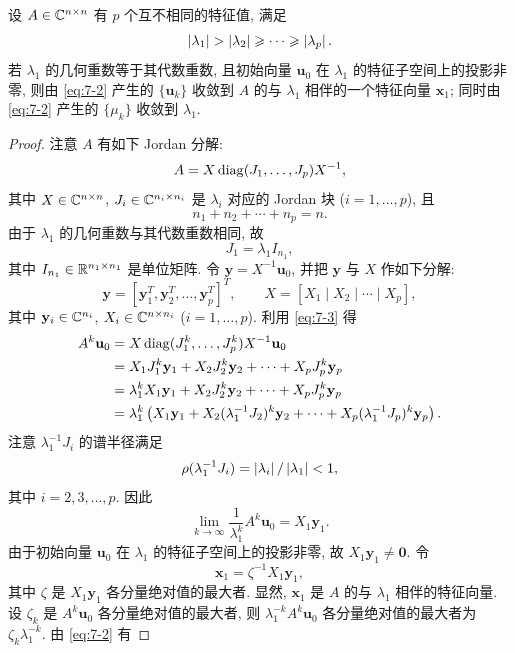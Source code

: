 \begin{theorem}
\label{thm:7-3}
设 $A\in\mathbb{C}^{n\times n}$ 有 $p$ 个互不相同的特征值, 满足
\[
  \abs{\lambda_1}>\abs{\lambda_2}\geqslant\cdots\geqslant\abs{\lambda_p}.
\]
若 $\lambda_1$ 的几何重数等于其代数重数, 且初始向量 $\mathbf{u}_0$ 在 $\lambda_1$ 的特征子空间上的投影非零, 则由 \eqref{eq:7-2} 产生的 $\{\mathbf{u}_k\}$ 收敛到 $A$ 的与 $\lambda_1$ 相伴的一个特征向量 $\mathbf{x}_1$; 同时由 \eqref{eq:7-2} 产生的 $\{\mu_k\}$ 收敛到 $\lambda_1$.
\end{theorem}

\begin{proof}
注意 $A$ 有如下 Jordan 分解:
\begin{equation}
  A=X\operatorname{diag}(J_1,\ldots,J_p)X^{-1},
  \label{eq:7-3}
\end{equation}
其中 $X\in\mathbb{C}^{n\times n}$, $J_i\in\mathbb{C}^{n_i\times n_i}$ 是 $\lambda_i$ 对应的 Jordan 块 ($i=1,\ldots,p$), 且
\[
  n_1+n_2+\cdots+n_p=n.
\]
由于 $\lambda_1$ 的几何重数与其代数重数相同, 故
\[
  J_1=\lambda_1I_{n_1},
\]
其中 $I_{n_1}\in\mathbb{R}^{n_1\times n_1}$ 是单位矩阵. 令 $\mathbf{y}=X^{-1}\mathbf{u}_0$, 并把 $\mathbf{y}$ 与 $X$ 作如下分解:
\[
  \mathbf{y}=[\mathbf{y}_1^T,\mathbf{y}_2^T,\ldots,\mathbf{y}_p^T]^T,
  \qquad
  X=[X_1\mid X_2\mid\cdots\mid X_p],
\]
其中 $\mathbf{y}_i\in\mathbb{C}^{n_i}$, $X_i\in\mathbb{C}^{n\times n_i}$ ($i=1,\ldots,p$). 利用 \eqref{eq:7-3} 得
\[
  \begin{aligned}
    A^k\mathbf{u}_0
    &=X\operatorname{diag}(J_1^k,\ldots,J_p^k)X^{-1}\mathbf{u}_0\\
    &=X_1J_1^k\mathbf{y}_1+X_2J_2^k\mathbf{y}_2+\cdots+X_pJ_p^k\mathbf{y}_p\\
    &=\lambda_1^kX_1\mathbf{y}_1+X_2J_2^k\mathbf{y}_2+\cdots+X_pJ_p^k\mathbf{y}_p\\
    &=\lambda_1^k\left(X_1\mathbf{y}_1
      +X_2(\lambda_1^{-1}J_2)^k\mathbf{y}_2
      +\cdots+X_p(\lambda_1^{-1}J_p)^k\mathbf{y}_p\right).
  \end{aligned}
\]
注意 $\lambda_1^{-1}J_i$ 的谱半径满足
\[
  \rho(\lambda_1^{-1}J_i)=\left|\lambda_i\right|/\left|\lambda_1\right|<1,
\]
其中 $i=2,3,\ldots,p$. 因此
\begin{equation}
  \lim_{k\rightarrow\infty}\frac{1}{\lambda_1^k}A^k\mathbf{u}_0=X_1\mathbf{y}_1.
  \label{eq:7-4}
\end{equation}
由于初始向量 $\mathbf{u}_0$ 在 $\lambda_1$ 的特征子空间上的投影非零, 故 $X_1\mathbf{y}_1\neq\mathbf{0}$. 令
\[
  \mathbf{x}_1=\zeta^{-1}X_1\mathbf{y}_1,
\]
其中 $\zeta$ 是 $X_1\mathbf{y}_1$ 各分量绝对值的最大者. 显然, $\mathbf{x}_1$ 是 $A$ 的与 $\lambda_1$ 相伴的特征向量. 设 $\zeta_k$ 是 $A^k\mathbf{u}_0$ 各分量绝对值的最大者, 则 $\lambda_1^{-k}A^k\mathbf{u}_0$ 各分量绝对值的最大者为 $\zeta_k\lambda_1^{-k}$. 由 \eqref{eq:7-2} 有

\end{proof}
